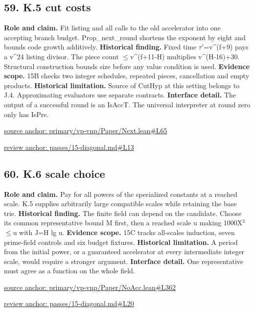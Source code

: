 \documentclass[11pt,letterpaper]{article}
\theoremstyle{definition}\newtheorem{definition}[theorem]{Definition}\newtheorem{example}[theorem]{Example}
\theoremstyle{remark}\newtheorem{remark}[theorem]{Remark}
\begin{document}
\subsection*{59. K.5 cut costs}
\textbf{Role and claim.} Fit listing and all calls to the old accelerator into one accepting branch budget. Prop\_next\_round shortens the exponent by eight and bounds code growth additively.
\textbf{Historical finding.} Fixed time \ensuremath{\tau}\ensuremath{\prime}=v\textasciicircum{}(f+9) pays a v\textasciicircum{}24 listing divisor. The piece count \ensuremath{\le}v\textasciicircum{}(f+11-H) multiplies v\textasciicircum{}(H-16)+30. Structural construction bounds size before any value condition is used.
\textbf{Evidence scope.} 15B checks two integer schedules, repeated pieces, cancellation and empty products.
\textbf{Historical limitation.} Source of CutHyp at this setting belongs to J.4. Approximating evaluators use separate contracts.
\textbf{Interface detail.} The output of a successful round is an IsAccT. The universal interpreter at round zero only has IsPre.
\par\href{https://github.com/nousentllc/VP-VNP-Review/blob/8a7976933b6b2b4ffda1ad3a0dfb5fc6b6f023e8/primary/vp-vnp/Paper/Next.lean\#L65}{source anchor: primary/vp-vnp/Paper/Next.lean\#L65}
\par\href{https://github.com/nousentllc/VP-VNP-Review/blob/8a7976933b6b2b4ffda1ad3a0dfb5fc6b6f023e8/passes/15-diagonal.md\#L13}{review anchor: passes/15-diagonal.md\#L13}
\goodbreak
{}
\hypertarget{claim.60}{}
\subsection*{60. K.6 scale choice}
\textbf{Role and claim.} Pay for all powers of the specialized constants at a reached scale. K.5 supplies arbitrarily large compatible scales while retaining the base trie.
\textbf{Historical finding.} The finite field can depend on the candidate. Choose its common representative bound M first, then a reached scale u making 1000X\ensuremath{{}^3}\ensuremath{\le}u with J=H lg u.
\textbf{Evidence scope.} 15C tracks all-scales induction, seven prime-field controls and six budget fixtures.
\textbf{Historical limitation.} A period from the initial power, or a guaranteed accelerator at every intermediate integer scale, would require a stronger argument.
\textbf{Interface detail.} One representative must agree as a function on the whole field.
\par\href{https://github.com/nousentllc/VP-VNP-Review/blob/8a7976933b6b2b4ffda1ad3a0dfb5fc6b6f023e8/primary/vp-vnp/Paper/NoAcc.lean\#L362}{source anchor: primary/vp-vnp/Paper/NoAcc.lean\#L362}
\par\href{https://github.com/nousentllc/VP-VNP-Review/blob/8a7976933b6b2b4ffda1ad3a0dfb5fc6b6f023e8/passes/15-diagonal.md\#L20}{review anchor: passes/15-diagonal.md\#L20}
\goodbreak
{}
\hypertarget{claim.61}{}
\end{document}
